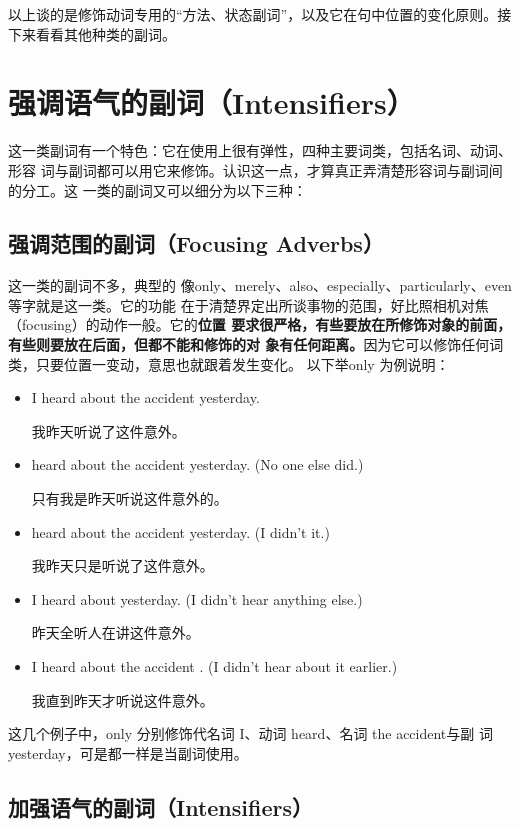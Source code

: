 以上谈的是修饰动词专用的“方法、状态副词”，以及它在句中位置的变化原则。接下来看看其他种类的副词。

\section{强调语气的副词（Intensifiers）}

这一类副词有一个特色：它在使用上很有弹性，四种主要词类，包括名词、动词、形容
词与副词都可以用它来修饰。认识这一点，才算真正弄清楚形容词与副词间的分工。这
一类的副词又可以细分为以下三种：

\subsection{强调范围的副词（Focusing Adverbs）}

这一类的副词不多，典型的
像only、merely、also、especially、particularly、even等字就是这一类。它的功能
在于清楚界定出所谈事物的范围，好比照相机对焦（focusing）的动作一般。它的\textbf{位置
  要求很严格，有些要放在所修饰对象的前面，有些则要放在后面，但都不能和修饰的对
  象有任何距离。}因为它可以修饰任何词类，只要位置一变动，意思也就跟着发生变化。
以下举only 为例说明：
\begin{itemize}
\item I heard about the accident yesterday.

  我昨天听说了这件意外。
\item {} heard about the accident yesterday. (No one else did.)

  只有我是昨天听说这件意外的。
\item {} heard about the accident yesterday. (I didn't it.)

  我昨天只是听说了这件意外。
\item I heard about  yesterday. (I didn't hear anything
  else.)

  昨天全听人在讲这件意外。
\item I heard about the accident . (I didn't hear about it
  earlier.)

  我直到昨天才听说这件意外。
\end{itemize}
这几个例子中，only 分别修饰代名词 I、动词 heard、名词 the accident与副
词 yesterday，可是都一样是当副词使用。

\subsection{加强语气的副词（Intensifiers）}

